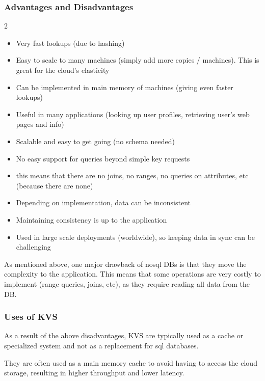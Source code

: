 \subsubsection{Advantages and Disadvantages}
\begin{multicols}{2}
    \begin{itemize}
        \item Very fast lookups (due to hashing)
        \item Easy to scale to many machines (simply add more copies / machines). This is great for the cloud's elasticity
        \item Can be implemented in main memory of machines (giving even faster lookups)
        \item Useful in many applications (looking up user profiles, retrieving user's web pages and info)
        \item Scalable and easy to get going (no schema needed)
    \end{itemize}

    \begin{itemize}
        \item No easy support for queries beyond simple key requests
        \item this means that there are no joins, no ranges, no queries on attributes, etc (because there are none)
        \item Depending on implementation, data can be inconsistent
        \item Maintaining consistency is up to the application
        \item Used in large scale deployments (worldwide), so keeping data in sync can be challenging
    \end{itemize}
\end{multicols}
As mentioned above, one major drawback of \acrshort{nosql} DBs is that they move the complexity to the application.
This means that some operations are very costly to implement (range queries, joins, etc), as they require reading all data from the DB.


\subsubsection{Uses of KVS}
As a result of the above disadvantages, KVS are typically used as a cache or specialized system and not as a replacement for \acrshort{sql} databases.

They are often used as a main memory cache to avoid having to access the cloud storage, resulting in higher throughput and lower latency.

